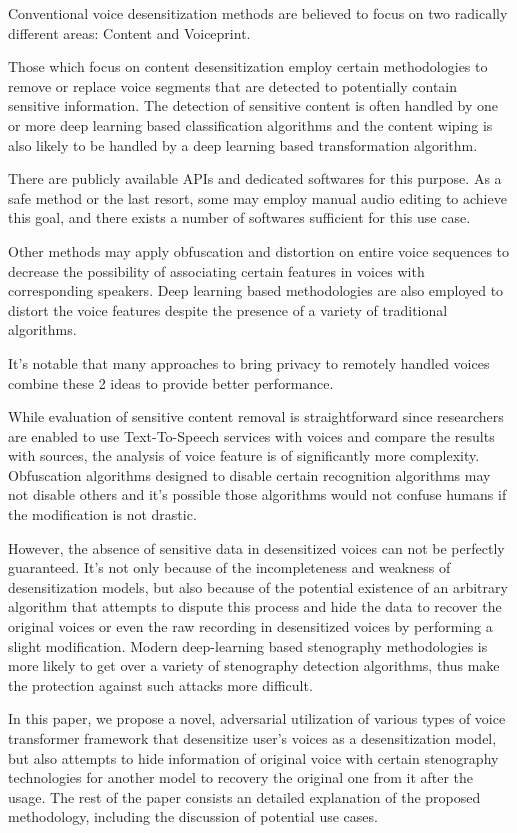 \documentclass[journal]{IEEEtran} %
\begin{document}
Conventional voice desensitization methods are believed to focus on two radically different areas: Content and Voiceprint.

Those which focus on content desensitization employ certain methodologies to remove or replace voice segments that are detected to potentially contain sensitive information. The detection of sensitive content is often handled by one or more deep learning based classification algorithms and the content wiping is also likely to be handled by a deep learning based transformation algorithm. 

There are publicly available APIs\cite{a13} and dedicated softwares for this purpose\cite{a14}. As a safe method or the last resort, some may employ manual audio editing to achieve this goal, and there exists a number of softwares sufficient for this use case\cite{a15}.

Other methods may apply obfuscation and distortion on entire voice sequences to decrease the possibility of associating certain features in voices with corresponding speakers. Deep learning based methodologies are also employed to distort the voice features despite the presence of a variety of traditional algorithms\cite{a9, a10, a11}. 

It's notable that many approaches to bring privacy to remotely handled voices combine these 2 ideas to provide better performance.

While evaluation of sensitive content removal is straightforward since researchers are enabled to use Text-To-Speech services with voices and compare the results with sources, the analysis of voice feature is of significantly more complexity. Obfuscation algorithms designed to disable certain recognition algorithms may not disable others and it's possible those algorithms would not confuse humans if the modification is not drastic.

However, the absence of sensitive data in desensitized voices can not be perfectly guaranteed. It's not only because of the incompleteness and weakness of desensitization models, but also because of the potential existence of an arbitrary algorithm that attempts to dispute this process and hide the data to recover the original voices or even the raw recording in desensitized voices by performing a slight modification. Modern deep-learning based stenography methodologies is more likely to get over a variety of stenography detection algorithms\cite{a1}, thus make the protection against such attacks more difficult.

In this paper, we propose a novel, adversarial utilization of various types of voice transformer framework that desensitize user's voices as a desensitization model, but also attempts to hide information of original voice with certain stenography technologies for another model to recovery the original one from it after the usage. The rest of the paper consists an detailed explanation of the proposed methodology, including the discussion of potential use cases.
\end{document}
